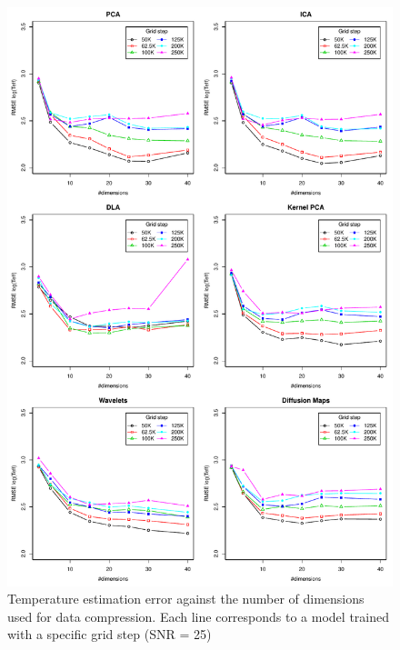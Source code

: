 \documentclass[a4paper,fleqn,usenatbib]{mnras}
\begin{document}
{{{\begin{figure}
\centering\includegraphics[height=0.95\textheight]{bestSVM_Teff_N-RMSE_HR10_snr=25_all.pdf}
\caption{Temperature estimation error against the number of dimensions
  used for data compression. Each line corresponds to a model trained
  with a specific grid step (SNR = 25)}
\label{fig:grid25}
\end{figure}

}}}
\end{document}
